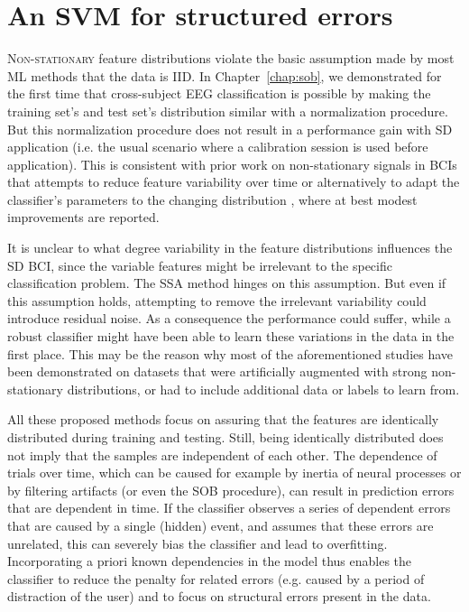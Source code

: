 \chapter{An SVM for structured errors} \label{chap:dsvm}
\begin{sloppypar}
\lettrine{N}{on-stationary} feature distributions violate the basic assumption
made by most \ac{ML} methods that the data is \ac{IID}. In
Chapter~\ref{chap:sob}, we demonstrated for the first time that cross-subject
\ac{EEG} classification is possible by making the training set's and test set's
distribution similar with a normalization procedure. But this normalization
procedure does not result in a performance gain with \acf{SD} application (i.e.
the usual scenario where a calibration session is used before application).
%
This is consistent with prior work on non-stationary signals in \acp{BCI} that
attempts to reduce feature variability over time \cite{hill2006tdd,
tomioka2006asf, blankertz2007ics, bunau2009ssa, meinecke2009lis,
reuderink2010sss} or alternatively to adapt the classifier's parameters to the
changing distribution \cite{shenoy2006tac, vidaurre2007sol}, where at best
modest improvements are reported.
\end{sloppypar}

It is unclear to what degree variability in the feature distributions
influences the \ac{SD} \ac{BCI}, since the variable features might be
irrelevant to the specific classification problem. The \ac{SSA} method
\cite{bunau2009ssa, meinecke2009lis} hinges on this assumption. But even if
this assumption holds, attempting to remove the irrelevant variability could
introduce residual noise. As a consequence the performance could suffer, while
a robust classifier might have been able to learn these variations in the data
in the first place. This may be the reason why most of the aforementioned
studies have been demonstrated on datasets that were artificially augmented
with strong non-stationary distributions, or had to include additional data or
labels to learn from.

All these proposed methods focus on assuring that the features are identically
distributed during training and testing. Still, being identically distributed
does not imply that the samples are independent of each other.
%
The dependence of trials over time, which can be caused for example by inertia
of neural processes or by filtering artifacts (or even the \ac{SOB} procedure), can result in prediction errors
that are dependent in time. 
%
If the classifier observes a series of dependent errors that are caused by a
single (hidden) event, and assumes that these errors are unrelated, this can
severely bias the classifier and lead to overfitting.
%
Incorporating a priori known dependencies in the model thus enables the
classifier to reduce the penalty for related errors (e.g. caused by a period of
distraction of the user) and to focus on structural errors present in the data.
 
